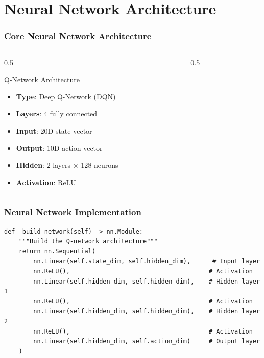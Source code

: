 \documentclass{beamer}
\begin{document}
\section{Neural Network Architecture}

\begin{frame}
\frametitle{Core Neural Network Architecture}
\begin{columns}
\begin{column}{0.5\textwidth}
\begin{block}{Q-Network Architecture}
\begin{itemize}
\item \textbf{Type}: Deep Q-Network (DQN)
\item \textbf{Layers}: 4 fully connected
\item \textbf{Input}: 20D state vector
\item \textbf{Output}: 10D action vector
\item \textbf{Hidden}: 2 layers × 128 neurons
\item \textbf{Activation}: ReLU
\end{itemize}
\end{block}
\end{column}
\begin{column}{0.5\textwidth}
\begin{center}
\end{center}
\end{column}
\end{columns}
\end{frame}

\begin{frame}[fragile]
\frametitle{Neural Network Implementation}
\begin{lstlisting}
def _build_network(self) -> nn.Module:
    """Build the Q-network architecture"""
    return nn.Sequential(
        nn.Linear(self.state_dim, self.hidden_dim),      # Input layer
        nn.ReLU(),                                      # Activation
        nn.Linear(self.hidden_dim, self.hidden_dim),    # Hidden layer 1
        nn.ReLU(),                                      # Activation
        nn.Linear(self.hidden_dim, self.hidden_dim),    # Hidden layer 2
        nn.ReLU(),                                      # Activation
        nn.Linear(self.hidden_dim, self.action_dim)     # Output layer
    )
\end{lstlisting}
\end{frame}
\end{document}
